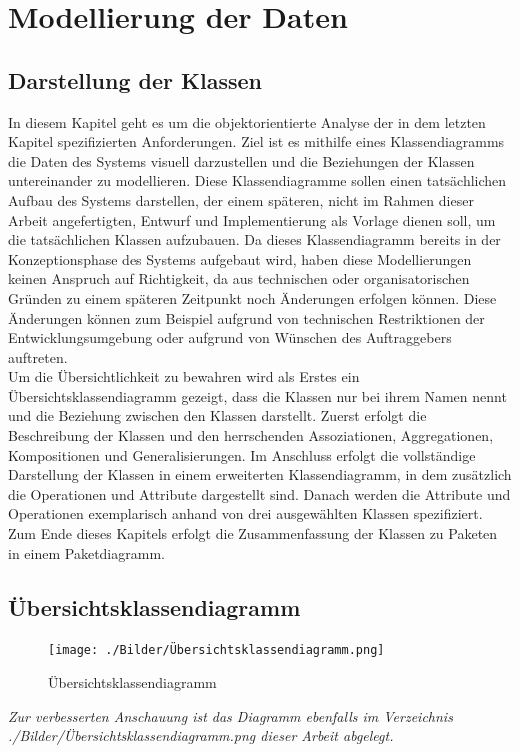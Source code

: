 \section{Modellierung der Daten}
\subsection{Darstellung der Klassen}
In diesem Kapitel geht es um die objektorientierte Analyse der in dem letzten Kapitel spezifizierten Anforderungen. Ziel ist es mithilfe eines Klassendiagramms die Daten des Systems visuell darzustellen und die Beziehungen der Klassen untereinander zu modellieren. Diese Klassendiagramme sollen einen tatsächlichen Aufbau des Systems darstellen, der einem späteren, nicht im Rahmen dieser Arbeit angefertigten, Entwurf und Implementierung als Vorlage dienen soll, um die tatsächlichen Klassen aufzubauen. Da dieses Klassendiagramm bereits in der Konzeptionsphase des Systems aufgebaut wird, haben diese Modellierungen keinen Anspruch auf Richtigkeit, da aus technischen oder organisatorischen Gründen zu einem späteren Zeitpunkt noch Änderungen erfolgen können. Diese Änderungen können zum Beispiel aufgrund von technischen Restriktionen der Entwicklungsumgebung oder aufgrund von Wünschen des Auftraggebers auftreten.
\\Um die Übersichtlichkeit zu bewahren wird als Erstes ein Übersichtsklassendiagramm gezeigt, dass die Klassen nur bei ihrem Namen nennt und die Beziehung zwischen den Klassen darstellt. Zuerst erfolgt die Beschreibung der Klassen und den herrschenden Assoziationen, Aggregationen, Kompositionen und Generalisierungen. Im Anschluss erfolgt die vollständige Darstellung der Klassen in einem erweiterten Klassendiagramm, in dem zusätzlich die Operationen und Attribute dargestellt sind. Danach werden die Attribute und Operationen exemplarisch anhand von drei ausgewählten Klassen spezifiziert. Zum Ende dieses Kapitels erfolgt die Zusammenfassung der Klassen zu Paketen in einem Paketdiagramm.    

\newpage
\subsection{Übersichtsklassendiagramm}
\begin{figure}[h!]
    \centering
    \texttt{[image: ./Bilder/Übersichtsklassendiagramm.png]}
    \caption[Übersichtsklassendiagramm]{Übersichtsklassendiagramm}
    \label{fig:Übersichtsklassendiagramm}
\end{figure}
\emph{Zur verbesserten Anschauung ist das Diagramm ebenfalls im Verzeichnis ./Bilder/Übersichtsklassendiagramm.png dieser Arbeit abgelegt.}

